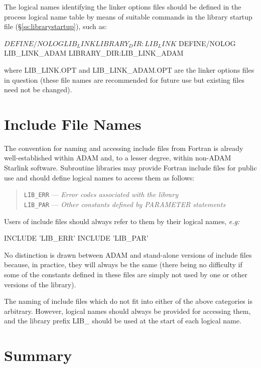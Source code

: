 \documentclass[noabs,11pt,nolof]{starlink}
\begin{document}
The logical names identifying the linker options files should be defined in
the process logical name table by means of suitable commands in the library
startup file (\S\ref{ss:librarystartup}), such as:

\begin{terminalv}
$ DEFINE/NOLOG LIB_LINK      LIBRARY_DIR:LIB_LINK
$ DEFINE/NOLOG LIB_LINK_ADAM LIBRARY_DIR:LIB_LINK_ADAM
\end{terminalv}

where LIB\_LINK.OPT and LIB\_LINK\_ADAM.OPT are the linker options files in
question (these file names are recommended for future use but existing files
need not be changed).


\section{Include File Names}

The convention for naming and accessing include files from Fortran is
already well-established within ADAM and, to a lesser degree, within
non-ADAM Starlink software.
Subroutine libraries may provide Fortran include files for public use and
should define logical names to access them as follows:

\begin{quote}
\texttt{LIB\_ERR} --- \emph{Error codes associated with the library} \\
\texttt{LIB\_PAR} --- \emph{Other constants defined by PARAMETER statements}
\end{quote}

Users of include files should always refer to them by their logical names,
\emph{e.g:}

\begin{terminalv}
INCLUDE 'LIB_ERR'
INCLUDE 'LIB_PAR'
\end{terminalv}

No distinction is drawn between ADAM and stand-alone versions of include
files because, in practice, they will always be the same (there being no
difficulty if some of the constants defined in these files are simply not
used by one or other versions of the library).

The naming of include files which do not fit into either of the above
categories is arbitrary.
However, logical names should always be provided for accessing them, and the
library prefix LIB\_ should be used at the start of each logical name.

\newpage
\appendix
\section{Summary}
\end{document}
